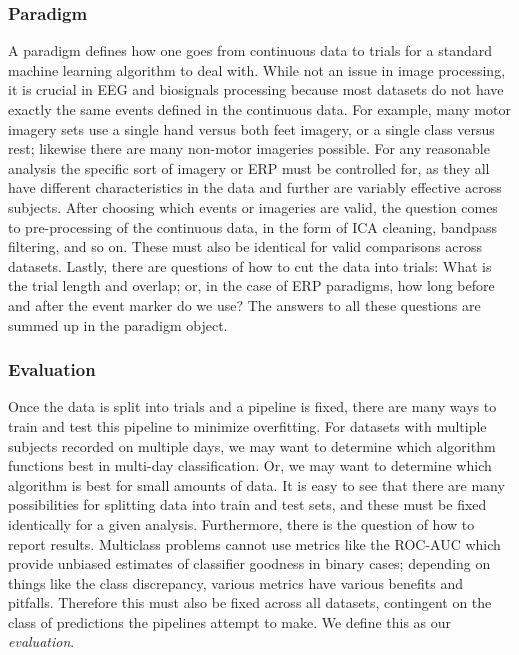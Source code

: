 \subsubsection{Paradigm}

A paradigm defines how one goes from continuous data to trials for a standard
machine learning algorithm to deal with. While not an issue in image processing,
it is crucial in EEG and biosignals processing because most datasets do not have
exactly the same events defined in the continuous data. For example, many motor
imagery sets use a single hand versus both feet imagery, or a single class
versus rest; likewise there are many non-motor imageries possible. For any
reasonable analysis the specific sort of imagery or ERP must be controlled for,
as they all have different characteristics in the data and further are variably
effective across subjects\cite{Scherer2015}. After choosing which events or
imageries are valid, the question comes to pre-processing of the continuous
data, in the form of ICA cleaning, bandpass filtering, and so on. These must
also be identical for valid comparisons across datasets. Lastly, there are
questions of how to cut the data into trials: What is the trial length and
overlap; or, in the case of ERP paradigms, how long before and after the event
marker do we use? The answers to all these questions are summed up in the
paradigm object.

\subsubsection{Evaluation}

Once the data is split into trials and a pipeline is fixed, there are many ways to train and test this pipeline to minimize overfitting. For datasets with multiple subjects recorded on multiple days, we may want to determine which algorithm functions best in multi-day classification. Or, we may want to determine which algorithm is best for small amounts of data. It is easy to see that there are many possibilities for splitting data into train and test sets, and these must be fixed identically for a given analysis. Furthermore, there is the question of how to report results. Multiclass problems cannot use metrics like the ROC-AUC which provide unbiased estimates of classifier goodness in binary cases; depending on things like the class discrepancy, various metrics have various benefits and pitfalls. Therefore this must also be fixed across all datasets, contingent on the class of predictions the pipelines attempt to make. We define this as our \emph{evaluation}.

